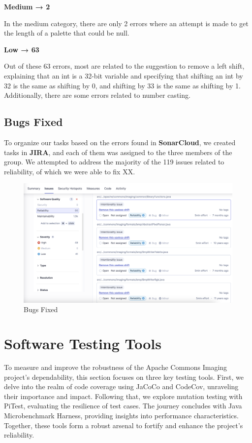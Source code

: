 \documentclass[sigconf]{acmart}
\begin{document}
\textbf{Medium → 2}

In the medium category, there are only 2 errors where an attempt is made to get the length of a palette that could be null.

\textbf{Low → 63}

Out of these 63 errors, most are related to the suggestion to remove a left shift, explaining that an int is a 32-bit variable and specifying that shifting an int by 32 is the same as shifting by 0, and shifting by 33 is the same as shifting by 1. Additionally, there are some errors related to number casting.

\subsection{Bugs Fixed}

To organize our tasks based on the errors found in \textbf{SonarCloud}\cite{sonarcloud}, we created tasks in \textbf{JIRA}\cite{jira}, and each of them was assigned to the three members of the group. We attempted to address the majority of the 119 issues related to reliability, of which we were able to fix XX.

\begin{figure}[h!]
    \centering
    \includegraphics[width=1\linewidth]{reportSonarCloudFixed.png}
    \caption{Bugs Fixed}
    \label{fig:enter-label}
\end{figure}


\section{Software Testing Tools}

To measure and improve the robustness of the Apache Commons Imaging project's dependability, this section focuses on three key testing tools. First, we delve into the realm of code coverage using JaCoCo and CodeCov, unraveling their importance and impact. Following that, we explore mutation testing with PiTest, evaluating the resilience of test cases. The journey concludes with Java Microbenchmark Harness, providing insights into performance characteristics. Together, these tools form a robust arsenal to fortify and enhance the project's reliability.
\end{document}
